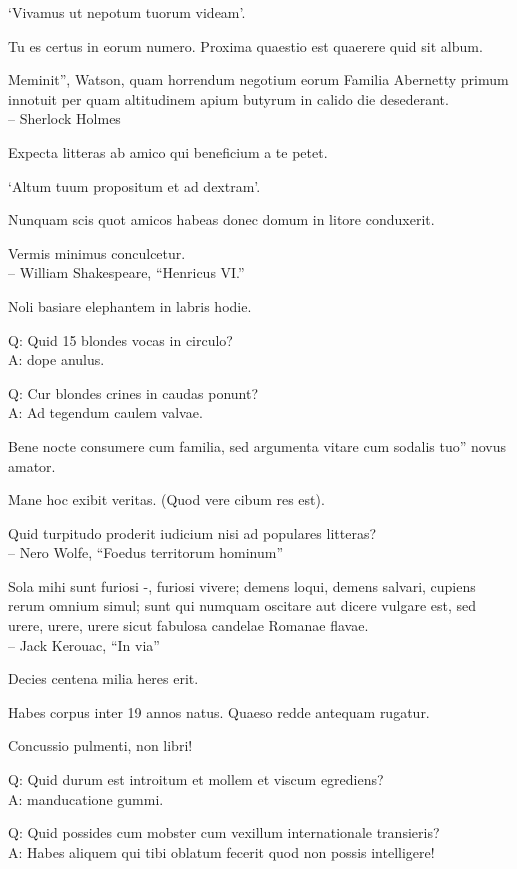 \documentclass[titlepage,12pt]{memoir}
\begin{document}
‘Vivamus ut nepotum tuorum videam’.

Tu es certus in eorum numero. Proxima quaestio est quaerere quid sit album.

Meminit”, Watson, quam horrendum negotium eorum
Familia Abernetty primum innotuit per quam altitudinem
apium butyrum in calido die desederant.
\\-- Sherlock Holmes

Expecta litteras ab amico qui beneficium a te petet.

‘Altum tuum propositum et ad dextram’.

Nunquam scis quot amicos habeas donec domum in litore conduxerit.

Vermis minimus conculcetur.
\\-- William Shakespeare, “Henricus VI.”

Noli basiare elephantem in labris hodie.

Q: Quid 15 blondes vocas in circulo?\\
A: dope anulus.

Q: Cur blondes crines in caudas ponunt?\\
A: Ad tegendum caulem valvae.

Bene nocte consumere cum familia, sed argumenta vitare cum sodalis tuo”
novus amator.

Mane hoc exibit veritas. (Quod vere cibum res est).

Quid turpitudo proderit iudicium nisi ad populares litteras?
\\-- Nero Wolfe, “Foedus territorum hominum”

Sola mihi sunt furiosi -, furiosi vivere;
demens loqui, demens salvari, cupiens rerum omnium simul;
sunt qui numquam oscitare aut dicere vulgare est, sed urere, urere, urere
sicut fabulosa candelae Romanae flavae.
\\-- Jack Kerouac, “In via”

Decies centena milia heres erit.

Habes corpus inter 19 annos natus. Quaeso redde antequam rugatur.

Concussio pulmenti, non libri!

Q: Quid durum est introitum et mollem et viscum egrediens?\\
A: manducatione gummi.

Q: Quid possides cum mobster cum vexillum internationale transieris?\\
A: Habes aliquem qui tibi oblatum fecerit quod non possis intelligere!
\end{document}

